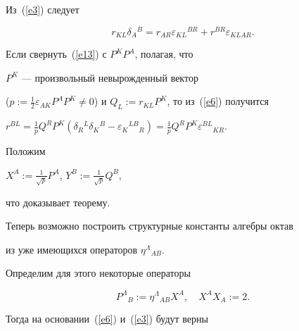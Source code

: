 \begin{pf}


Из~(\ref{e3}) следует


\begin{equation}


\label{e13}


r_{KL}\delta_A{}^B=r_{AR}\varepsilon_{KL}{}^{BR}+r^{BR}\varepsilon_{KLAR}.


\end{equation}


Если свернуть~(\ref{e13}) с $P^KP^A$, полагая, что


$P^K$ --- произвольный невырожденный вектор


($p:=\frac{1}{2}\varepsilon_{AK}


P^AP^K\ne 0$) и $Q_L:=r_{KL}P^K$, то из~(\ref{e6}) получится




$r^{BL}=\frac{1}{p}Q^RP^K(\delta_R{}^L\delta_K{}^B-


\varepsilon_K{}^{LB}{}_R)=\frac{1}{p}Q^RP^K\varepsilon^{BL}{}_{KR}$.




Положим




$X^A:=\frac{1}{\sqrt{p}}P^A$, $Y^B:=\frac{1}{\sqrt{p}}Q^B$,




что доказывает теорему.


\end{pf}





Теперь возможно построить структурные константы алгебры октав


из уже имеющихся операторов $\eta^\Lambda{}_{AB}$.


Определим для этого некоторые операторы


\begin{equation}


\label{e18}


P^\Lambda{}_B:=\eta^\Lambda{}_{AB}X^A,\quad X^AX_A:=2.


\end{equation}


Тогда на основании~(\ref{e6}) и~(\ref{e3}) будут верны


